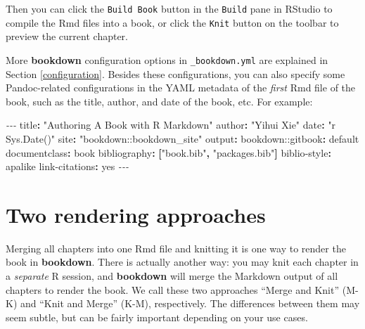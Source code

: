 \documentclass[
]{book}
\newenvironment{Shaded}{\begin{snugshade}}{\end{snugshade}}
\newcommand{\AttributeTok}[1]{\textcolor[rgb]{0.77,0.63,0.00}{#1}}
\newcommand{\CharTok}[1]{\textcolor[rgb]{0.31,0.60,0.02}{#1}}
\newcommand{\FunctionTok}[1]{\textcolor[rgb]{0.00,0.00,0.00}{#1}}
\newcommand{\KeywordTok}[1]{\textcolor[rgb]{0.13,0.29,0.53}{\textbf{#1}}}
\newcommand{\PreprocessorTok}[1]{\textcolor[rgb]{0.56,0.35,0.01}{\textit{#1}}}
\newcommand{\StringTok}[1]{\textcolor[rgb]{0.31,0.60,0.02}{#1}}
\begin{document}
Then you can click the \texttt{Build\ Book} button in the \texttt{Build} pane in RStudio to compile the Rmd files into a book, or click the \texttt{Knit} button on the toolbar to preview the current chapter.

More \textbf{bookdown} configuration options in \texttt{\_bookdown.yml} are explained in Section \ref{configuration}. Besides these configurations, you can also specify some Pandoc-related configurations in the YAML metadata of the \emph{first} Rmd file of the book, such as the title, author, and date of the book, etc. For example:

\begin{Shaded}
\begin{Highlighting}[]
\PreprocessorTok{{-}{-}{-} }
\FunctionTok{title}\KeywordTok{:}\AttributeTok{ }\StringTok{"Authoring A Book with R Markdown"}
\FunctionTok{author}\KeywordTok{:}\AttributeTok{ }\StringTok{"Yihui Xie"}
\FunctionTok{date}\KeywordTok{:}\AttributeTok{ }\StringTok{"\textasciigrave{}r Sys.Date()\textasciigrave{}"}
\FunctionTok{site}\KeywordTok{:}\AttributeTok{ }\StringTok{"bookdown::bookdown\_site"}
\FunctionTok{output}\KeywordTok{:}
\AttributeTok{  bookdown:}\FunctionTok{:gitbook}\KeywordTok{:}\AttributeTok{ default}
\FunctionTok{documentclass}\KeywordTok{:}\AttributeTok{ book}
\FunctionTok{bibliography}\KeywordTok{:}\AttributeTok{ }\KeywordTok{[}\StringTok{"book.bib"}\KeywordTok{,}\AttributeTok{ }\StringTok{"packages.bib"}\KeywordTok{]}
\FunctionTok{biblio{-}style}\KeywordTok{:}\AttributeTok{ apalike}
\FunctionTok{link{-}citations}\KeywordTok{:}\AttributeTok{ }\CharTok{yes}
\PreprocessorTok{{-}{-}{-}}
\end{Highlighting}
\end{Shaded}

\hypertarget{new-session}{%
\section{Two rendering approaches}\label{new-session}}

Merging all chapters into one Rmd file and knitting it is one way to render the book in \textbf{bookdown}. There is actually another way: you may knit each chapter in a \emph{separate} R session, and \textbf{bookdown} will merge the Markdown output of all chapters to render the book. We call these two approaches ``Merge and Knit'' (M-K) and ``Knit and Merge'' (K-M), respectively. The differences between them may seem subtle, but can be fairly important depending on your use cases.
\end{document}
